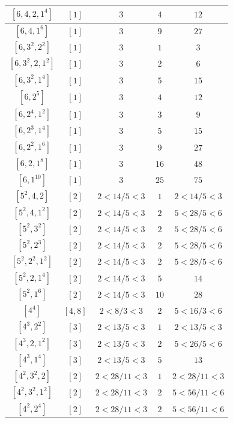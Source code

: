 \documentclass{article}%
\begin{document}
\begin{center}
\begin{longtable}{||c|c|c|c|c||}
$[6, 4, 2, 1^{4}]$ & $[1]$ & $3$ & $4$ & $12$ \\ \hline 
$[6, 4, 1^{6}]$ & $[1]$ & $3$ & $9$ & $27$ \\ \hline 
$[6, 3^{2}, 2^{2}]$ & $[1]$ & $3$ & $1$ & $3$ \\ \hline 
$[6, 3^{2}, 2, 1^{2}]$ & $[1]$ & $3$ & $2$ & $6$ \\ \hline 
$[6, 3^{2}, 1^{4}]$ & $[1]$ & $3$ & $5$ & $15$ \\ \hline 
$[6, 2^{5}]$ & $[1]$ & $3$ & $4$ & $12$ \\ \hline 
$[6, 2^{4}, 1^{2}]$ & $[1]$ & $3$ & $3$ & $9$ \\ \hline 
$[6, 2^{3}, 1^{4}]$ & $[1]$ & $3$ & $5$ & $15$ \\ \hline 
$[6, 2^{2}, 1^{6}]$ & $[1]$ & $3$ & $9$ & $27$ \\ \hline 
$[6, 2, 1^{8}]$ & $[1]$ & $3$ & $16$ & $48$ \\ \hline 
$[6, 1^{10}]$ & $[1]$ & $3$ & $25$ & $75$ \\ \hline 
$[5^{2}, 4, 2]$ & $[2]$ & $2 < 14/5 < 3$ & $1$ & $2 < 14/5 < 3$ \\ \hline 
$[5^{2}, 4, 1^{2}]$ & $[2]$ & $2 < 14/5 < 3$ & $2$ & $5 < 28/5 < 6$ \\ \hline 
$[5^{2}, 3^{2}]$ & $[2]$ & $2 < 14/5 < 3$ & $2$ & $5 < 28/5 < 6$ \\ \hline 
$[5^{2}, 2^{3}]$ & $[2]$ & $2 < 14/5 < 3$ & $2$ & $5 < 28/5 < 6$ \\ \hline 
$[5^{2}, 2^{2}, 1^{2}]$ & $[2]$ & $2 < 14/5 < 3$ & $2$ & $5 < 28/5 < 6$ \\ \hline 
$[5^{2}, 2, 1^{4}]$ & $[2]$ & $2 < 14/5 < 3$ & $5$ & $14$ \\ \hline 
$[5^{2}, 1^{6}]$ & $[2]$ & $2 < 14/5 < 3$ & $10$ & $28$ \\ \hline 
$[4^{4}]$ & $[4, 8]$ & $2 < 8/3 < 3$ & $2$ & $5 < 16/3 < 6$ \\ \hline 
$[4^{3}, 2^{2}]$ & $[3]$ & $2 < 13/5 < 3$ & $1$ & $2 < 13/5 < 3$ \\ \hline 
$[4^{3}, 2, 1^{2}]$ & $[3]$ & $2 < 13/5 < 3$ & $2$ & $5 < 26/5 < 6$ \\ \hline 
$[4^{3}, 1^{4}]$ & $[3]$ & $2 < 13/5 < 3$ & $5$ & $13$ \\ \hline 
$[4^{2}, 3^{2}, 2]$ & $[2]$ & $2 < 28/11 < 3$ & $1$ & $2 < 28/11 < 3$ \\ \hline 
$[4^{2}, 3^{2}, 1^{2}]$ & $[2]$ & $2 < 28/11 < 3$ & $2$ & $5 < 56/11 < 6$ \\ \hline 
$[4^{2}, 2^{4}]$ & $[2]$ & $2 < 28/11 < 3$ & $2$ & $5 < 56/11 < 6$ \\ \hline 

\end{longtable}
\end{center}
\end{document}
